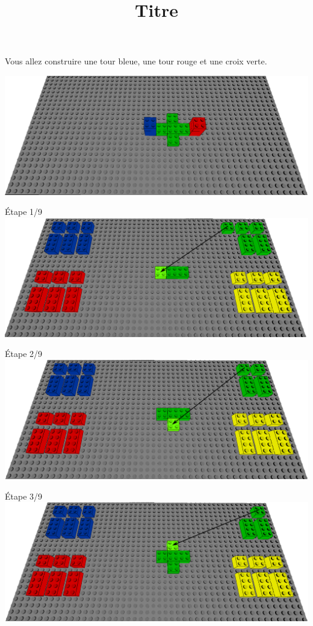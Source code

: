 \documentclass[aspectratio=169]{beamer}
\title{Titre}
\begin{document}
\begin{frame}
    Vous allez construire une tour bleue, une tour rouge et une croix verte.
    \vfill
    \begin{center}
        \includegraphics[width=\linewidth]{figure.png}
    \end{center}
\end{frame}

\begin{frame}
    Étape 1/9
    \vfill
  \includegraphics[width=\linewidth]{step1.png}
\end{frame}

\begin{frame}
    Étape 2/9
    \vfill
  \includegraphics[width=\linewidth]{step2.png}
\end{frame}

\begin{frame}
    Étape 3/9
    \vfill
  \includegraphics[width=\linewidth]{step3.png}
\end{frame}
\end{document}
